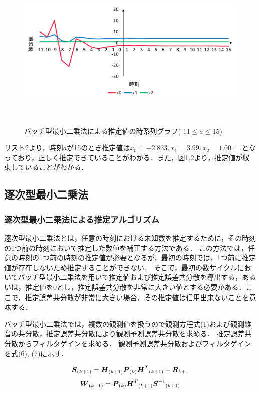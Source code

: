 \documentclass[a4paper]{jarticle}
\begin{document}
\begin{figure}[!h]
  \centering
  \includegraphics[width=16cm]{batch2.png}
  \caption{バッチ型最小二乗法による推定値の時系列グラフ(-11$\le a \le $15)}
　\label{graph}
\end{figure}

リスト2より，時刻$a$が15のとき推定値は\(x_{0}=-2.833, x_1 = 3.991 x_2 = 1.001\)　となっており，正しく推定できていることがわかる．また，図1,2より，推定値が収束していることがわかる．

\clearpage
\subsection{逐次型最小二乗法}\label{program}
\subsubsection{逐次型最小二乗法による推定アルゴリズム}
逐次型最小二乗法とは，任意の時刻における未知数を推定するために，その時刻の1つ前の時刻において推定した数値を補正する方法である．
この方法では，任意の時刻の1つ前の時刻の推定値が必要となるが，最初の時刻では，1つ前に推定値が存在しないため推定することができない．
そこで，最初の数サイクルにおいてバッチ型最小二乗法を用いて推定値および推定誤差共分散を導出する，あるいは，推定値を0とし，推定誤差共分散を非常に大きい値とする必要がある．ここで，推定誤差共分散が非常に大きい場合，その推定値は信用出来ないことを意味する．

バッチ型最小二乗法では，複数の観測値を扱うので観測方程式(1)および観測雑音の共分散，推定誤差共分散により観測予測誤差共分散を求める．
推定誤差共分散からフィルタゲインを求める．
観測予測誤差共分散およびフィルタゲインを式(6), (7)に示す．

\begin{equation}
\mbox{\boldmath ${S}$}_{(k+1)} =
\mbox{\boldmath $H$}_{(k+1)} 
\mbox{\boldmath $P$}_{(k)} 
{\mbox{\boldmath $H$}^{T}}_{(k+1)}
+
\mbox{\boldmath $R$}_{k+1}
\vspace{3mm}
\end{equation}
\begin{equation}
\mbox{\boldmath ${W}$}_{(k+1)} =
\mbox{\boldmath $P$}_{(k)} 
{\mbox{\boldmath $H$}^{T}}_{(k+1)}
{\mbox{\boldmath $S$}^{-1}}_{(k+1)}
\vspace{3mm}
\end{equation}
\end{document}
